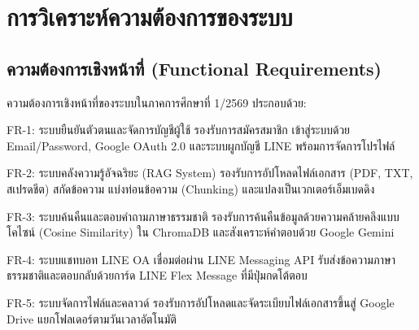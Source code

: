 \section{การวิเคราะห์ความต้องการของระบบ}

\subsection{ความต้องการเชิงหน้าที่ (Functional Requirements)}
\hspace*{1.3em}
ความต้องการเชิงหน้าที่ของระบบในภาคการศึกษาที่ 1/2569 ประกอบด้วย:
\begin{mycustomitem}
\item FR-1: ระบบยืนยันตัวตนและจัดการบัญชีผู้ใช้ รองรับการสมัครสมาชิก เข้าสู่ระบบด้วย Email/Password, Google OAuth 2.0 และระบบผูกบัญชี LINE พร้อมการจัดการโปรไฟล์
\end{mycustomitem}
\begin{mycustomitem}
\item FR-2: ระบบคลังความรู้อัจฉริยะ (RAG System) รองรับการอัปโหลดไฟล์เอกสาร (PDF, TXT, สเปรดชีต) สกัดข้อความ แบ่งท่อนข้อความ (Chunking) และแปลงเป็นเวกเตอร์เอ็มเบดดิง
\end{mycustomitem}
\begin{mycustomitem}
\item FR-3: ระบบค้นคืนและตอบคำถามภาษาธรรมชาติ รองรับการค้นคืนข้อมูลด้วยความคล้ายคลึงแบบโคไซน์ (Cosine Similarity) ใน ChromaDB และสังเคราะห์คำตอบด้วย Google Gemini
\end{mycustomitem}
\begin{mycustomitem}
\item FR-4: ระบบแชทบอท LINE OA เชื่อมต่อผ่าน LINE Messaging API รับส่งข้อความภาษาธรรมชาติและตอบกลับด้วยการ์ด LINE Flex Message ที่มีปุ่มกดโต้ตอบ
\end{mycustomitem}
\begin{mycustomitem}
\item FR-5: ระบบจัดการไฟล์และคลาวด์ รองรับการอัปโหลดและจัดระเบียบไฟล์เอกสารขึ้นสู่ Google Drive แยกโฟลเดอร์ตามวันเวลาอัตโนมัติ
\end{mycustomitem}

